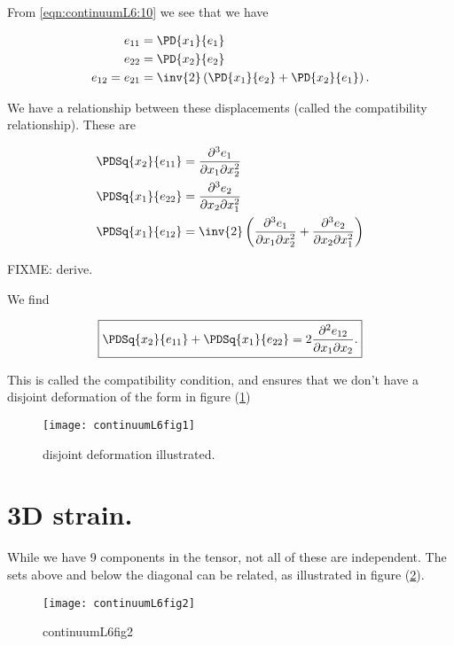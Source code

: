 From \ref{eqn:continuumL6:10} we see that we have

\begin{align}\label{eqn:continuumL6:70}
e_{11} &= \PD{x_1}{e_1} \\
e_{22} &= \PD{x_2}{e_2} \\
e_{12} = e_{21} &= 
\inv{2} \left( 
\PD{x_1}{e_2}
+ \PD{x_2}{e_1} \right).
\end{align}

We have a relationship between these displacements (called the compatibility relationship).  These are 

\begin{align}\label{eqn:continuumL6:90}
\PDSq{x_2}{e_{11}} &= \frac{\partial^3 e_1}{\partial x_1 \partial x_2^2} \\
\PDSq{x_1}{e_{22}} &= \frac{\partial^3 e_2}{\partial x_2 \partial x_1^2} \\
\PDSq{x_1}{e_{12}} &= 
\inv{2} \left(
\frac{\partial^3 e_1}{\partial x_1 \partial x_2^2} 
+
\frac{\partial^3 e_2}{\partial x_2 \partial x_1^2} 
\right)
\end{align}

FIXME: derive.

We find

\begin{equation}\label{eqn:continuumL6:110}
\boxed{
\PDSq{x_2}{e_{11}} +
\PDSq{x_1}{e_{22}} = 
2
\frac{\partial^2 e_{12}}{\partial x_1 \partial x_2}.
}
\end{equation}

This is called the compatibility condition, and ensures that we don't have a disjoint deformation of the form in figure (\ref{fig:continuumL6:continuumL6fig1})

\begin{figure}[htp]
   \centering
   \texttt{[image: continuumL6fig1]}
   \caption{disjoint deformation illustrated.}\label{fig:continuumL6:continuumL6fig1}
\end{figure}

\section{3D strain.}

While we have 9 components in the tensor, not all of these are independent.  The sets above and below the diagonal can be related, as illustrated in figure (\ref{fig:continuumL6:continuumL6fig2}).

\begin{figure}[htp]
   \centering
   \texttt{[image: continuumL6fig2]}
   \caption{continuumL6fig2}\label{fig:continuumL6:continuumL6fig2}
\end{figure}

